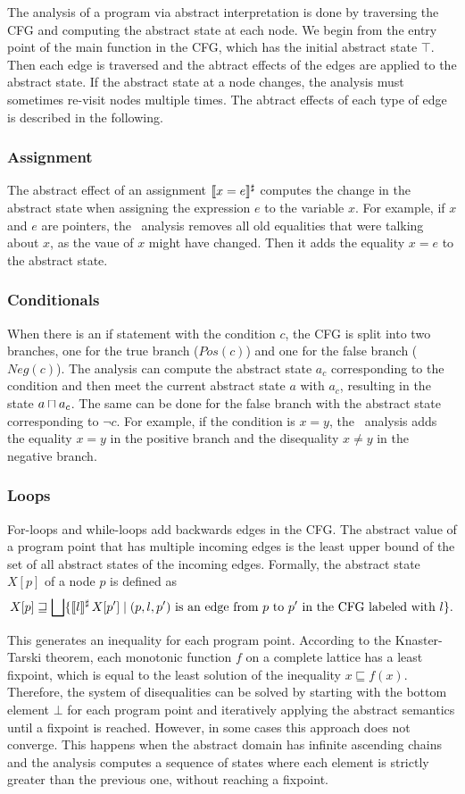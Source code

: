 The analysis of a program via abstract interpretation is done by traversing the CFG and computing the abstract state at each node.
We begin from the entry point of the \textsf{main} function in the CFG, which has the initial abstract state $\top$.
Then each edge is traversed and the abtract effects of the edges are applied to the abstract state.
If the abstract state at a node changes, the analysis must sometimes re-visit nodes multiple times.
The abtract effects of each type of edge is described in the following.

\subsubsection{Assignment}
The abstract effect of an assignment $\llbracket x = e\rrbracket^\sharp$ computes the change in the abstract state when assigning the expression $e$ to the variable $x$.
For example, if $x$ and $e$ are pointers, the \cpo\ analysis removes all old equalities that were talking about $x$, as the vaue of $x$ might have changed.
Then it adds the equality $x = e$ to the abstract state.
\subsubsection{Conditionals}
When there is an if statement with the condition $c$, the CFG is split into two branches, one for the true branch ($Pos(c)$) and one for the false branch ($Neg(c)$).
The analysis can compute the abstract state $a_c$ corresponding to the condition and
then meet the current abstract state $a$ with $a_c$, resulting in the state $a \sqcap a_c$.
The same can be done for the false branch with the abstract state corresponding to $\neg c$.
For example, if the condition is $x = y$, the \cpo\ analysis adds the equality $x = y$
in the positive branch and the disequality $x \neq y$ in the negative branch.
\subsubsection{Loops}
For-loops and while-loops add backwards edges in the CFG.
The abstract value of a program point that has multiple incoming edges is
the least upper bound of the set of all abstract states of the incoming edges.
Formally, the abstract state $X[p]$ of a node $p$ is defined as
\[
  X[p] \sqsupseteq \bigsqcup \{\llbracket l\rrbracket^\sharp\,X[p'] \mid (p,l,p') \text{ is an edge from $p$ to $p'$ in the CFG labeled with $l$}\}.
\]

This generates an inequality for each program point.
According to the Knaster-Tarski theorem, each monotonic function $f$ on a complete lattice has a least fixpoint, which is equal to the least solution of the inequality $x \sqsubseteq f(x)$.
Therefore, the system of disequalities can be solved by starting with the bottom element $\bot$ for
each program point and iteratively applying the abstract semantics until a fixpoint is reached.
However, in some cases this approach does not converge.
This happens when the abstract domain has infinite ascending chains and the analysis
computes a sequence of states where each element is strictly greater than the previous one,
without reaching a fixpoint.


